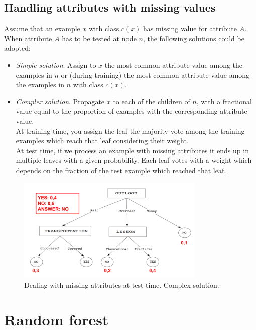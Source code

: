 \subsection{Handling attributes with missing values}
Assume that an example $x$ with class $c(x)$ has missing value for attribute $A$.
When attribute $A$ has to be tested at node $n$, the following solutions could be
adopted:
\begin{itemize}
	\item \textit{Simple solution}. Assign to $x$ the most common attribute value among
		the examples in $n$ or (during training) the most common attribute value among
		the examples in $n$ with class $c(x)$.

	\item \textit{Complex solution}. Propagate $x$ to each of the children of $n$,
		with a fractional value equal to the proportion of examples with the
		corresponding attribute value.\\At training time, you assign the leaf the
		majority vote among the training examples which reach that leaf considering
		their weight.\\At test time, if we process an example with missing
		attributes it ends up in multiple leaves with a given probability. Each leaf
		votes with a weight which depends on the fraction of the test example which reached
		that leaf.
\end{itemize}

\begin{figure}[H]
	\centering
	\includegraphics[width=0.8\textwidth]{
		images/02_DecisionTrees_missingAttributes.png
	}
	\caption{Dealing with missing attributes at test time. Complex solution.}
	\label{missing_attributes}
\end{figure}

\section{Random forest}

